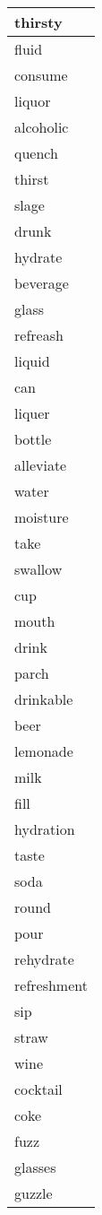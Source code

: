 \begin{longtable}{|p{3cm}|}
\hline \hline
\endlastfoot
thirsty \\ \hline
fluid \\ \hline
consume \\ \hline
liquor \\ \hline
alcoholic \\ \hline
quench \\ \hline
thirst \\ \hline
slage \\ \hline
drunk \\ \hline
hydrate \\ \hline
beverage \\ \hline
glass \\ \hline
refreash \\ \hline
liquid \\ \hline
can \\ \hline
liquer \\ \hline
bottle \\ \hline
alleviate \\ \hline
water \\ \hline
moisture \\ \hline
take \\ \hline
swallow \\ \hline
cup \\ \hline
mouth \\ \hline
drink \\ \hline
parch \\ \hline
drinkable \\ \hline
beer \\ \hline
lemonade \\ \hline
milk \\ \hline
fill \\ \hline
hydration \\ \hline
taste \\ \hline
soda \\ \hline
round \\ \hline
pour \\ \hline
rehydrate \\ \hline
refreshment \\ \hline
sip \\ \hline
straw \\ \hline
wine \\ \hline
cocktail \\ \hline
coke \\ \hline
fuzz \\ \hline
glasses \\ \hline
guzzle \\ \hline

\end{longtable}
